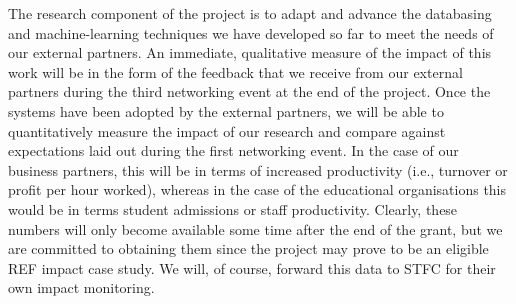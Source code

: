 \documentclass[11pt]{article}
\begin{document}
  \vspace{2mm}
  \noindent
  The research component of the project is to adapt and advance the databasing and machine-learning techniques we have developed so far to meet the needs of our external partners. An immediate, qualitative measure of the impact of this work will be in the form of the feedback that we receive from our external partners during the third networking event at the end of the project. Once the systems have been adopted by the external partners, we will be able to quantitatively measure the impact of our research and compare against expectations laid out during the first networking event. In the case of our business partners, this will be in terms of increased productivity (i.e., turnover or profit per hour worked), whereas in the case of the educational organisations this would be in terms student admissions or staff productivity. Clearly, these numbers will only become available some time after the end of the grant, but we are committed to obtaining them since the project may prove to be an eligible REF impact case study. We will, of course, forward this data to STFC for their own impact monitoring.
  
  
\end{document}

